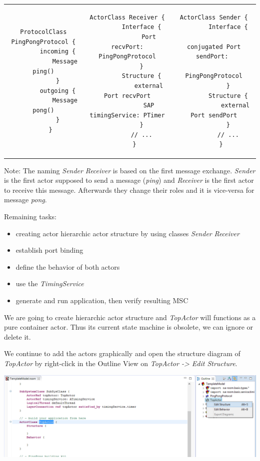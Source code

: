 \begin{tabular}{c|c|c}
	\begin{lstlisting}[language=ROOM]
	ProtocolClass PingPongProtocol {
		incoming {
			Message ping()
		}
		outgoing {
			Message pong()
		}
	}
	\end{lstlisting} & 
	\begin{lstlisting}[language=ROOM]
	ActorClass Receiver {
		Interface {
			Port recvPort: PingPongProtocol
		}
		Structure {
			external Port recvPort
			SAP timingService: PTimer
		}
		// ...
	}
	\end{lstlisting} &
	\begin{lstlisting}[language=ROOM]
	ActorClass Sender {
		Interface {
			conjugated Port sendPort: 
				PingPongProtocol
		}
		Structure {
			external Port sendPort
		}
		// ...
	}
	\end{lstlisting}
\end{tabular}


Note: The naming \emph{Sender} \emph{Receiver} is based on the first message exchange. \emph{Sender} is the first actor supposed to send a message (\emph{ping}) and \emph{Receiver} is the first actor to receive this message. Afterwards they change their roles and it is vice-versa for message \emph{pong}.

Remaining tasks:
\begin{itemize}
	\item creating actor hierarchic actor structure by using classes \emph{Sender} \emph{Receiver}
	\item establish port binding
	\item define the behavior of both actors
	\item use the \emph{TimingService}
	\item generate and run application, then verify resulting MSC
\end{itemize}

We are going to create hierarchic actor structure and \emph{TopActor} will functions as a pure container actor. Thus its current state machine is obsolete, we can ignore or delete it.

We continue to add the actors graphically and open the structure diagram of \emph{TopActor} by right-click in the Outline View on \emph{TopActor -> Edit Structure}.

\includegraphics[width=\textwidth]{images/015-edit-structure-top.png}

